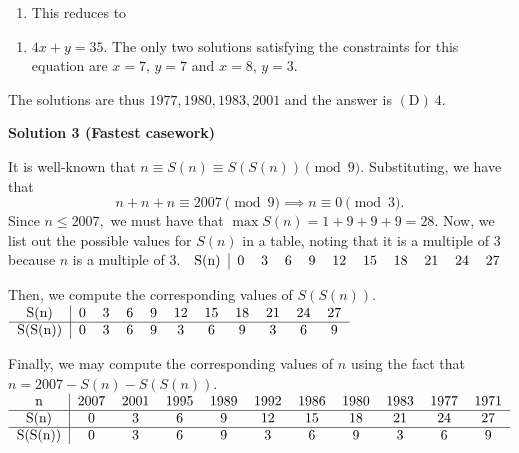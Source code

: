 \begin{enumerate}
 
            \begin{enumerate}[label=(\roman*)]
                \item This reduces to
            \end{enumerate}
            
            \begin{enumerate}[label=(\roman*)]
                \item $4x + y = 35$. The only two solutions satisfying the constraints for this equation are $x = 7$, $y = 7$ and $x = 8$, $y = 3$.
            \end{enumerate}
            The solutions are thus $1977, 1980, 1983, 2001$ and the answer is $\mathrm{(D)}\  4$.

 



\textbf{Solution 3 (Fastest casework)}

It is well-known that $n \equiv S(n)\equiv S(S(n)) \pmod{9}.$ Substituting, we have that 
 \[n+n+n \equiv 2007 \pmod{9} \implies n \equiv 0 \pmod{3}.\] Since $n \leq 2007,$ we must have that $\max S(n)=1+9+9+9=28.$ Now, we list out the possible values for $S(n)$ in a table, noting that it is a multiple of $3$ because $n$ is a multiple of $3.$
$\begin{tabular}{c|c c c c c c c c c c}   S(n) & 0 & 3 & 6 & 9 & 12 & 15 & 18 & 21 & 24 & 27 \\ \end{tabular}$

 

 Then, we compute the corresponding values of $S(S(n)).$
$\begin{tabular}{c|c c c c c c c c c c}   S(n) & 0 & 3 & 6 & 9 & 12 & 15 & 18 & 21 & 24 & 27 \\ \hline S(S(n)) & 0 & 3 & 6 & 9 & 3 & 6 & 9 & 3 & 6 & 9 \\ \end{tabular}$

 

 Finally, we may compute the corresponding values of $n$ using the fact that $n=2007-S(n)-S(S(n)).$
$\begin{tabular}{c|c c c c c c c c c c}  n & 2007 & 2001 & 1995 & 1989 & 1992 & 1986 & 1980 & 1983 & 1977 & 1971 \\ \hline S(n) & 0 & 3 & 6 & 9 & 12 & 15 & 18 & 21 & 24 & 27 \\ \hline S(S(n)) & 0 & 3 & 6 & 9 & 3 & 6 & 9 & 3 & 6 & 9 \\ \end{tabular}$


\end{enumerate}
